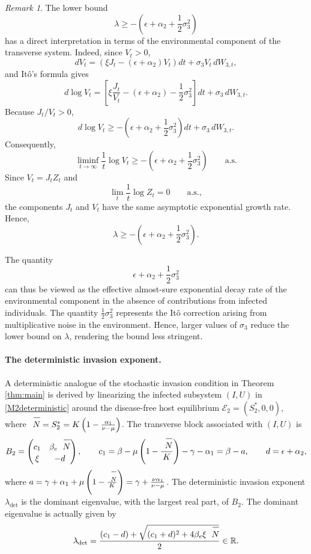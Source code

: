 \documentclass[12pt,a4paper,reqno]{amsart}
\theoremstyle{definition}
\theoremstyle{remark}
\newtheorem{remark}[theorem]{Remark}
\theoremstyle{plain}
\let\svoverline\overline
\newcommand{\uc}[1]{\mkern 5mu\svoverline{\mkern-1mu#1\mkern-0.3mu \rule{0pt}{3.5mm}}\mkern 0mu}
\let\overline\uc
\begin{document}
\begin{remark}\label{rem:environmental-noise-bound}
The lower bound
$$
\lambda
\geq
-\left(\epsilon+\alpha_2+\frac12\sigma_3^2\right)
$$
has a direct interpretation in terms of the environmental component of the transverse system. Indeed, since $V_t>0$,
$$
dV_t
=
\left(\xi J_t-(\epsilon+\alpha_2)V_t\right)dt
+\sigma_3V_t\,dW_{3,t},
$$
and It\^o's formula gives
$$
d\log V_t
=
\left[
\xi\frac{J_t}{V_t}
-(\epsilon+\alpha_2)
-\frac12\sigma_3^2
\right]dt
+\sigma_3\,dW_{3,t}.
$$
Because $J_t/V_t>0$,
$$
d\log V_t
\geq
-\left(\epsilon+\alpha_2+\frac12\sigma_3^2\right)dt
+\sigma_3\,dW_{3,t}.
$$
Consequently,
$$
\liminf_{t\to\infty}\frac1t\log V_t
\geq
-\left(\epsilon+\alpha_2+\frac12\sigma_3^2\right)
\qquad\text{a.s.}
$$
Since $V_t=J_tZ_t$ and
$$
\lim_t \frac1t\log Z_t=0
\qquad\text{a.s.},
$$
the components $J_t$ and $V_t$ have the same asymptotic exponential
growth rate. Hence,
$$
\lambda
\geq
-\left(\epsilon+\alpha_2+\frac12\sigma_3^2\right).
$$

The quantity
$$
\epsilon+\alpha_2+\frac12\sigma_3^2
$$
can thus be viewed as the effective almost-sure exponential decay rate of the environmental component in the absence of contributions from infected individuals. The quantity $\frac12\sigma_3^2$ represents the It\^o correction arising from multiplicative noise in the environment. Hence, larger values of $\sigma_3$ reduce the lower bound on $\lambda$, rendering the bound less stringent. 
\end{remark}

\paragraph{\textbf{The deterministic invasion exponent.}}
A deterministic analogue of the stochastic invasion condition in Theorem \ref{thm:main} is derived by linearizing the infected subsystem $(I,U)$ in \eqref{M2deterministic} around the disease-free host equilibrium $\mathcal E_2=(S_2^{*},0,0)$, where $\overline N=S_2^{*}=K\left(1-\frac{\alpha_1}{\nu-\mu}\right)$. The transverse block associated with $(I,U)$ is
\begin{equation}\label{eq:B2-transverse}
B_2=
\begin{pmatrix}
c_1 & \beta_e\,\overline N\\[2pt]
\xi & -d
\end{pmatrix},
\qquad
c_1=\beta-\mu\left(1-\frac{\overline N}{K}\right)-\gamma-\alpha_1=\beta-a,
\qquad
d=\epsilon+\alpha_2,
\end{equation}
where $a=\gamma+\alpha_1+\mu\left(1-\frac{\overline N}{K}\right)=\gamma+\frac{\nu\alpha_1}{\nu-\mu}$. The deterministic invasion exponent $\lambda_{\det}$ is the dominant eigenvalue, with the largest real part, of $B_2$. The dominant eigenvalue is actually given by
\begin{equation}\label{eq:lambda-det}
\lambda_{\det}=\frac{(c_1-d)+\sqrt{(c_1+d)^{2}+4\beta_e\xi\,\overline N}}{2} \in\mathbb R.
\end{equation}
\end{document}
